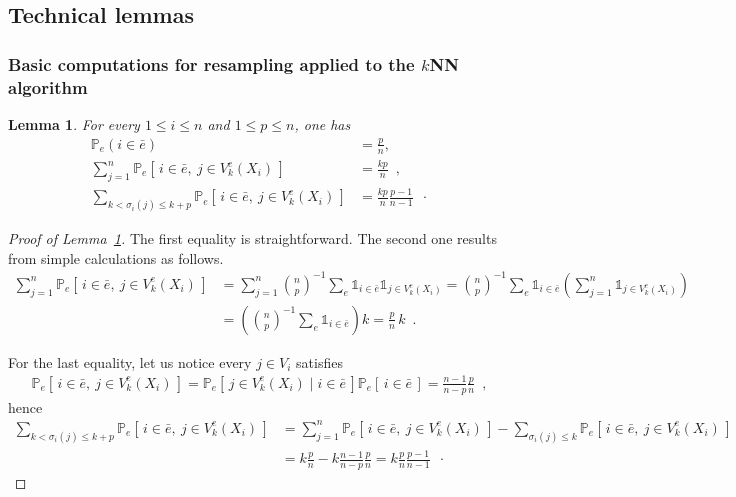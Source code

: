 \documentclass[twoside,11pt]{article}
\numberwithin{equation}{section}
\newtheorem{lem}{Lemma}[section]
\newcommand{\probi}[2]{\mathbb{P}_{#1}\left( #2 \right)}
\newcommand{\1}{\mathds{1}}%
\newcommand{\paren}[1]{\left( #1 \right)}
\newcommand{\croch}[1]{\left[\, #1 \,\right]}
\renewcommand{\P}{\mathbb{P}}
\newcommand{\eb}{\bar e}
\numberwithin{equation}{section}
\theoremstyle{plain}
\begin{document}
\subsection{Technical lemmas}



\subsubsection{Basic computations for resampling applied to the $k$NN algorithm}

\begin{lem}\label{BasicResultForResamplingKnn}
  For every $1\leq i \leq n$ and $1\leq p\leq n$, one has
\begin{align} \label{eq.sum.all.points}
\probi{e}{i\in \bar{e}}  & = \frac{p}{n}  ,\\
%
 \sum_{j=1}^n \P_e\croch{ i\in \eb,\ j\in V_k^e(X_i) } & = \frac{kp}{n} \enspace , \\
  \sum_{ k< \sigma_i(j)\leq k+p} \P_e\croch{ i\in \eb,\ j\in V_k^e(X_i) } & = \frac{kp}{n} \frac{p-1}{n-1} \enspace\cdot \label{eq.sum.faraway.neighbors.points}
\end{align}

\end{lem}

\begin{proof}[Proof of Lemma~\ref{BasicResultForResamplingKnn}]
%
The first equality is straightforward.
%
The second one results from simple calculations as follows.
\begin{align*}
    \sum_{j=1}^n \P_e\croch{ i\in \eb,\ j\in V_k^e(X_i) } & = \sum_{j=1}^n  {n\choose p}^{-1} \sum_{e} \1_{i\in\eb} \1_{j\in V_k^e(X_i)}  =  {n\choose p}^{-1} \sum_{e} \1_{i\in\eb}  \paren{  \sum_{j=1}^n \1_{j\in V_k^e(X_i)} }\\
%
& = \paren{ {n\choose p}^{-1} \sum_{e} \1_{i\in\eb} } k  = \frac{p}{n}\, k \enspace.
\end{align*}

For the last equality, let us notice every $j \in V_i$ satisfies
\begin{align*}
  \P_e\croch{ i\in \eb,\ j\in V_k^e(X_i) } = \P_e\croch{ j\in V_k^e(X_i) \mid i\in \eb}  \P_e\croch{ i\in \eb} =  \frac{n-1}{n-p} \frac{p}{n} \enspace,
\end{align*}
%
hence
\begin{align*}
  \sum_{ k< \sigma_i(j)\leq k+p} \P_e\croch{ i\in \eb,\ j\in V_k^e(X_i) } & = \sum_{ j=1}^n \P_e\croch{ i\in \eb,\ j\in V_k^e(X_i) } - \sum_{ \sigma_i(j)\leq k }\P_e\croch{ i\in \eb,\ j\in V_k^e(X_i) } \\
%
& = k \frac{p}{n} - k \frac{n-1}{n-p} \frac{p}{n} = k \frac{p}{n} \frac{p-1}{n-1} \enspace\cdot
\end{align*}
\end{proof}
\end{document}
